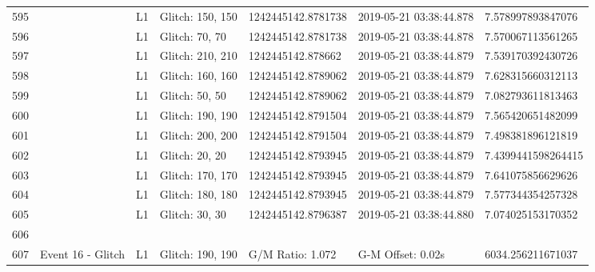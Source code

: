 \begin{longtable}{lllllll}
595  &                                                    &       L1 &  Glitch: 150, 150 &  1242445142.8781738 &  2019-05-21 03:38:44.878 &   7.578997893847076 \\
596  &                                                    &       L1 &    Glitch: 70, 70 &  1242445142.8781738 &  2019-05-21 03:38:44.878 &   7.570067113561265 \\
597  &                                                    &       L1 &  Glitch: 210, 210 &   1242445142.878662 &  2019-05-21 03:38:44.879 &   7.539170392430726 \\
598  &                                                    &       L1 &  Glitch: 160, 160 &  1242445142.8789062 &  2019-05-21 03:38:44.879 &   7.628315660312113 \\
599  &                                                    &       L1 &    Glitch: 50, 50 &  1242445142.8789062 &  2019-05-21 03:38:44.879 &   7.082793611813463 \\
600  &                                                    &       L1 &  Glitch: 190, 190 &  1242445142.8791504 &  2019-05-21 03:38:44.879 &   7.565420651482099 \\
601  &                                                    &       L1 &  Glitch: 200, 200 &  1242445142.8791504 &  2019-05-21 03:38:44.879 &   7.498381896121819 \\
602  &                                                    &       L1 &    Glitch: 20, 20 &  1242445142.8793945 &  2019-05-21 03:38:44.879 &  7.4399441598264415 \\
603  &                                                    &       L1 &  Glitch: 170, 170 &  1242445142.8793945 &  2019-05-21 03:38:44.879 &   7.641075856629626 \\
604  &                                                    &       L1 &  Glitch: 180, 180 &  1242445142.8793945 &  2019-05-21 03:38:44.879 &   7.577344354257328 \\
605  &                                                    &       L1 &    Glitch: 30, 30 &  1242445142.8796387 &  2019-05-21 03:38:44.880 &   7.074025153170352 \\
606  &                                                    &          &                   &                     &                          &                     \\
607  &                                  Event 16 - Glitch &       L1 &  Glitch: 190, 190 &    G/M Ratio: 1.072 &        G-M Offset: 0.02s &   6034.256211671037 \\

\end{longtable}
